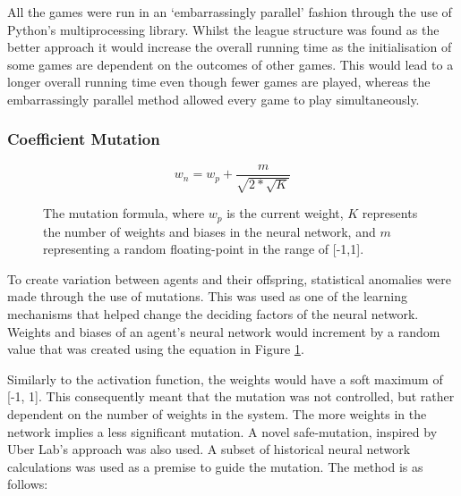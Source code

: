 \documentclass[12pt,a4paper]{article}
\begin{document}
            All the games were run in an `embarrassingly parallel' fashion through the use of Python's multiprocessing library. Whilst the league structure was found as the better approach \cite{al-khateeb_introducing_2009} it would increase the overall running time as the initialisation of some games are dependent on the outcomes of other games. This would lead to a longer overall running time even though fewer games are played, whereas the embarrassingly parallel method allowed every game to play simultaneously.
            
        \subsubsection{Coefficient Mutation} \label{coefficient_mutation}

            \begin{figure}
            \begin{equation}
                w_n = w_p + \frac{m}{\sqrt{2 * \sqrt{K} }}
            \end{equation}
            \caption{The mutation formula, where $w_p$ is the current weight, $K$ represents the number of weights and biases in the neural network, and $m$ representing a random floating-point in the range of [-1,1].\label{mutation}}
            \end{figure}

            To create variation between agents and their offspring, statistical anomalies were made through the use of mutations. This was used as one of the learning mechanisms that helped change the deciding factors of the neural network. Weights and biases of an agent's neural network would increment by a random value that was created using the equation in Figure \ref{mutation}.

            Similarly to the activation function,
            the weights would have a soft maximum of [-1, 1]. This consequently meant that the mutation was not controlled, but rather dependent on the number of weights in the system. The more weights in the network implies a less significant mutation. A novel safe-mutation, inspired by Uber Lab's approach \cite{lehman_safe_2017} was also used. A subset of historical neural network calculations was used as a premise to guide the mutation. The method is as follows:
             
\end{document}

